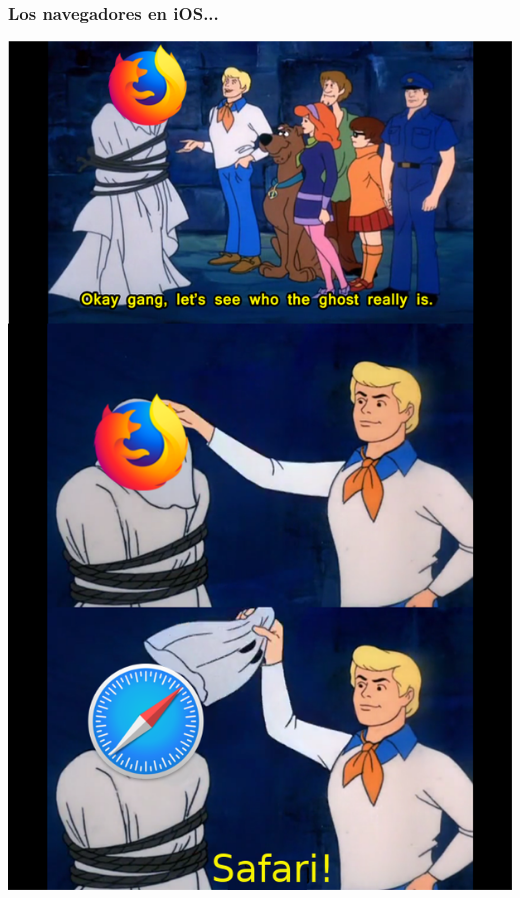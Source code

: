 \begin{frame}

    \frametitle{Los navegadores en iOS...}
    \centering
    \includegraphics[height=0.7\textheight]{images/browser-meme.png}
    
\end{frame}

